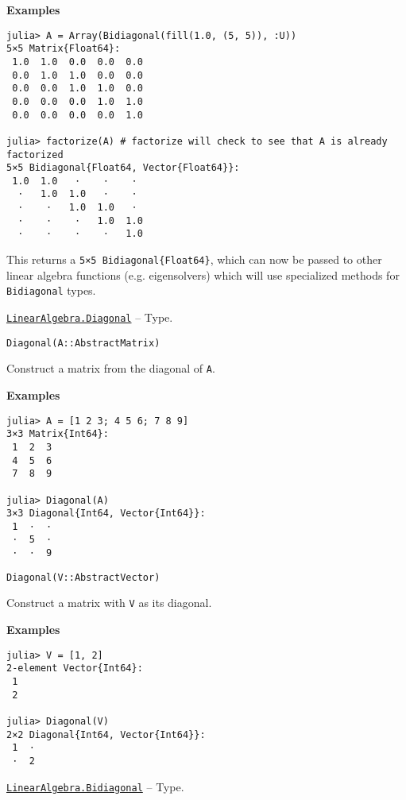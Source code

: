 \begin{adjustwidth}{2em}{0pt}
\textbf{Examples}


\begin{verbatim}
julia> A = Array(Bidiagonal(fill(1.0, (5, 5)), :U))
5×5 Matrix{Float64}:
 1.0  1.0  0.0  0.0  0.0
 0.0  1.0  1.0  0.0  0.0
 0.0  0.0  1.0  1.0  0.0
 0.0  0.0  0.0  1.0  1.0
 0.0  0.0  0.0  0.0  1.0

julia> factorize(A) # factorize will check to see that A is already factorized
5×5 Bidiagonal{Float64, Vector{Float64}}:
 1.0  1.0   ⋅    ⋅    ⋅
  ⋅   1.0  1.0   ⋅    ⋅
  ⋅    ⋅   1.0  1.0   ⋅
  ⋅    ⋅    ⋅   1.0  1.0
  ⋅    ⋅    ⋅    ⋅   1.0
\end{verbatim}

This returns a \texttt{5×5 Bidiagonal\{Float64\}}, which can now be passed to other linear algebra functions (e.g. eigensolvers) which will use specialized methods for \texttt{Bidiagonal} types.



\end{adjustwidth}
\hypertarget{3300114559258360989}{}
\hyperlink{3300114559258360989}{\texttt{LinearAlgebra.Diagonal}}  -- {Type.}

\begin{adjustwidth}{2em}{0pt}


\begin{verbatim}
Diagonal(A::AbstractMatrix)
\end{verbatim}

Construct a matrix from the diagonal of \texttt{A}.

\textbf{Examples}


\begin{verbatim}
julia> A = [1 2 3; 4 5 6; 7 8 9]
3×3 Matrix{Int64}:
 1  2  3
 4  5  6
 7  8  9

julia> Diagonal(A)
3×3 Diagonal{Int64, Vector{Int64}}:
 1  ⋅  ⋅
 ⋅  5  ⋅
 ⋅  ⋅  9
\end{verbatim}




\begin{lstlisting}
Diagonal(V::AbstractVector)
\end{lstlisting}

Construct a matrix with \texttt{V} as its diagonal.

\textbf{Examples}


\begin{verbatim}
julia> V = [1, 2]
2-element Vector{Int64}:
 1
 2

julia> Diagonal(V)
2×2 Diagonal{Int64, Vector{Int64}}:
 1  ⋅
 ⋅  2
\end{verbatim}



\end{adjustwidth}
\hypertarget{6156150905679680892}{}
\hyperlink{6156150905679680892}{\texttt{LinearAlgebra.Bidiagonal}}  -- {Type.}

